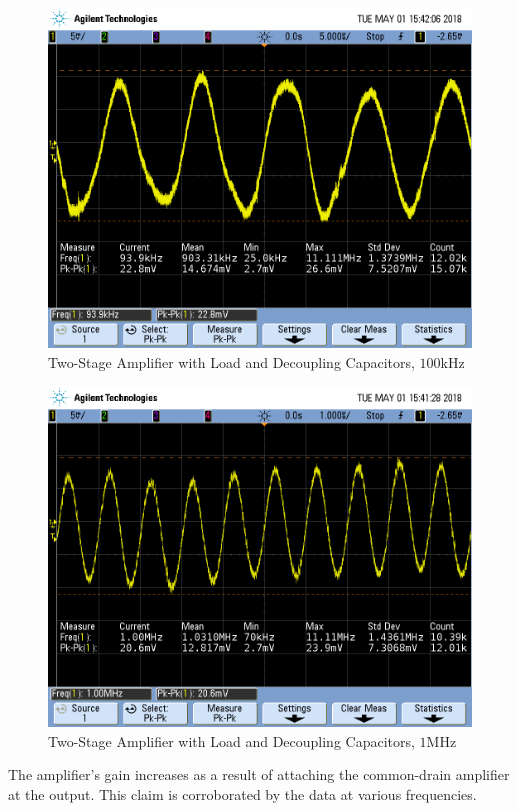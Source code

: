 \FloatBarrier

\begin{figure}[h!]
	\centering
	\includegraphics[scale=0.45]{./images/SCOPE_17.PNG}
	\caption{Two-Stage Amplifier with Load and Decoupling Capacitors, $100$\si{\kilo\hertz}}
	\label{fig:SCOPE_17}
\end{figure}

\FloatBarrier

\begin{figure}[h!]
	\centering
	\includegraphics[scale=0.45]{./images/SCOPE_16.PNG}
	\caption{Two-Stage Amplifier with Load and Decoupling Capacitors, $1$\si{\mega\hertz}}
	\label{fig:SCOPE_16}
\end{figure}

\FloatBarrier

The amplifier's gain increases as a result of attaching the common-drain amplifier at the output.
This claim is corroborated by the data at various frequencies.
